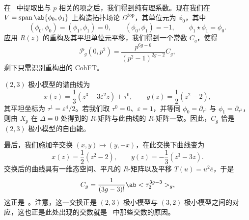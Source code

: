\documentclass{amsart}
\theoremstyle{definition}
\theoremstyle{remark}
\theoremstyle{plain}
\theoremstyle{definition}
\theoremstyle{remark}
\newcommand{\ep}{\varepsilon}
\newcommand{\mc}[1]{\mathcal{#1}}
\newcommand{\mr}[1]{\mathrm{#1}}
\newcommand{\on}[1]{\operatorname{#1}}
\newcommand{\1}{\mathbf{1}}
\newcommand{\2}{\mathbf{2}}
\newcommand{\3}{\mathbf{3}}
\begin{document}
在~ 中提取出与 \(p\) 相关的项之后，我们得到纯有理系数。现在我们在 \(V = \on{span}\ab\{\phi_0,\phi_1\}\) 上构造拓扑场论 \(\Omega^{\mr{top}}\)，其单位元为 \(\phi_0\)，其中
\[ (\phi_0,\phi_0) = (\phi_1,\phi_1) = 0, \qquad (\phi_0,\phi_1) = -1, \qquad \phi_1 \star \phi_1 = \phi_0. \]
应用 \(R(z)\) 的重构及其平坦单位元平移，我们得到一个常数 \(C_g\)，使得
\[ \mc{P}_g(0,p^2) = \frac{p^{6g-6}}{(p^2-1)^{2g-2}}C_g, \]
剩下只需识别重构出的 CohFT。

\((2,3)\) 极小模型的谱曲线为
\[ x(z) = \frac{1}{3}(z^3-3\ep^2 z) + \tau^0, \qquad y(z) = \frac{1}{2}(z^2-2), \]
其平坦坐标为 \(\tau^1 = \ep^4/2\)。若我们取 \(\tau^0 = 0\)、\(\ep = 1\)，并等同 \(\phi_0 = \partial_{\tau^0}\) 与 \(\phi_1 = \partial_{\tau^1}\)，则由 \(X_p\) 在 \(\Delta = 0\) 处得到的 \(R\)-矩阵与此曲线的 \(R\)-矩阵一致。因此，\(C_g\) 恰是 \((2,3)\) 极小模型的自由能。

最后，我们施加辛交换 \((x,y) \mapsto (y,-x)\)，在此交换下曲线变为
\[ x(z) = \frac{1}{2}(z^2-2), \qquad y(z) = -\frac{1}{3}(z^3-3z). \]
交换后的曲线具有一维态空间、平凡的 \(R\)-矩阵以及平移 \(T(u) = u^2 \bar{e}\)，于是
\[ C_g = \frac{1}{(3g-3)!}\ab<\tau_2^{3g-3}>_g, \]
这正是~。注意，这一交换正是 \((2,3)\) 极小模型与 \((3,2)\) 极小模型之间的对应，这也正是此处出现的交数就是~ 中那些交数的原因。

\printbibliography
\end{document}
